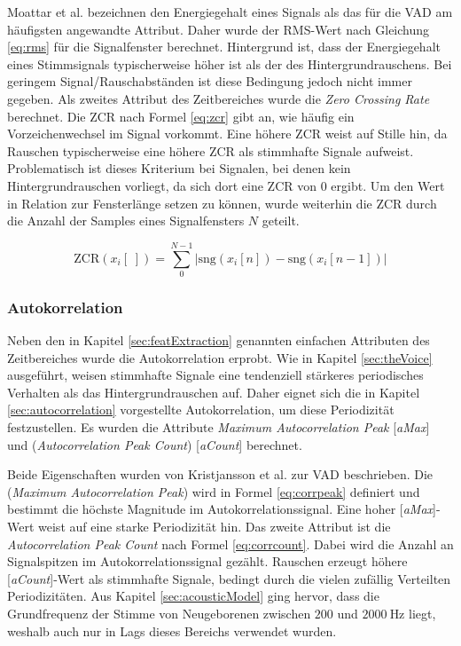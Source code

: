 Moattar et al. \cite{vad_Easy} bezeichnen den Energiegehalt eines Signals als das für die VAD am häufigsten angewandte Attribut. Daher wurde der RMS-Wert nach Gleichung \ref{eq:rms} für die Signalfenster berechnet. Hintergrund ist, dass der Energiegehalt eines Stimmsignals typischerweise höher ist als der des Hintergrundrauschens. Bei geringem Signal/Rauschabständen ist diese Bedingung jedoch nicht immer gegeben. Als zweites Attribut des Zeitbereiches wurde die \emph{Zero Crossing Rate} berechnet. Die ZCR nach Formel \ref{eq:zcr} gibt an, wie häufig ein Vorzeichenwechsel im Signal vorkommt. Eine höhere ZCR weist auf Stille hin, da Rauschen typischerweise eine höhere ZCR als stimmhafte Signale aufweist. Problematisch ist dieses Kriterium bei Signalen, bei denen kein Hintergrundrauschen vorliegt, da sich dort eine ZCR von 0 ergibt.\cite{vad_ceps} Um den Wert in Relation zur Fensterlänge setzen zu können, wurde weiterhin die ZCR durch die Anzahl der Samples eines Signalfensters $N$ geteilt.

\begin{equation}
\text{ZCR}(x_i[\;]) = \sum_{0}^{N-1}|\text{sng}(x_i[n])-\text{sng}(x_i[n-1])|
\label{eq:zcr}
\end{equation}

\subsubsection{Autokorrelation}

Neben den in Kapitel \ref{sec:featExtraction} genannten \glqq einfachen\grqq{} Attributen des Zeitbereiches wurde die Autokorrelation erprobt. Wie in Kapitel \ref{sec:theVoice} ausgeführt, weisen stimmhafte Signale eine tendenziell stärkeres periodisches Verhalten als das Hintergrundrauschen auf. Daher eignet sich die in Kapitel \ref{sec:autocorrelation} vorgestellte Autokorrelation, um diese Periodizität festzustellen. Es wurden die Attribute \emph{Maximum Autocorrelation Peak} [\emph{aMax}] und (\emph{Autocorrelation Peak Count}) [\emph{aCount}] berechnet. 

Beide Eigenschaften wurden von Kristjansson et al. \cite[S. 1 - 2]{vad_Lisboa} zur VAD beschrieben. Die (\emph{Maximum Autocorrelation Peak}) wird in Formel \ref{eq:corrpeak} definiert und bestimmt die höchste Magnitude im Autokorrelationssignal. Eine hoher [\emph{aMax}]-Wert weist auf eine starke Periodizität hin. Das zweite Attribut ist die \emph{Autocorrelation Peak Count} nach Formel \ref{eq:corrcount}. Dabei wird die Anzahl an Signalspitzen im Autokorrelationssignal gezählt. Rauschen erzeugt höhere [\emph{aCount}]-Wert als stimmhafte Signale, bedingt durch die vielen zufällig Verteilten Periodizitäten. Aus Kapitel \ref{sec:acousticModel} ging hervor, dass die Grundfrequenz der Stimme von Neugeborenen zwischen $200$ und $\SI{2000}{\hertz}$ liegt, weshalb auch nur in Lags dieses Bereichs verwendet wurden.

